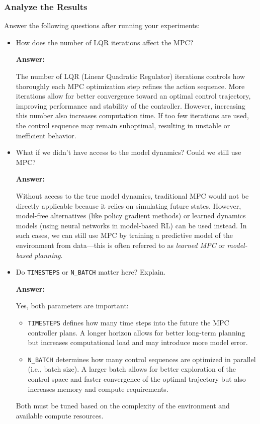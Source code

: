 \subsubsection{Analyze the Results} 
Answer the following questions after running your experiments: 
\begin{itemize} 
    \item How does the number of LQR iterations affect the MPC? 

    \textbf{Answer:}

    The number of LQR (Linear Quadratic Regulator) iterations controls how thoroughly each MPC optimization step refines the action sequence. More iterations allow for better convergence toward an optimal control trajectory, improving performance and stability of the controller. However, increasing this number also increases computation time. If too few iterations are used, the control sequence may remain suboptimal, resulting in unstable or inefficient behavior.

    \item What if we didn't have access to the model dynamics? Could we still use MPC? 

    \textbf{Answer:}

    Without access to the true model dynamics, traditional MPC would not be directly applicable because it relies on simulating future states. However, model-free alternatives (like policy gradient methods) or learned dynamics models (using neural networks in model-based RL) can be used instead. In such cases, we can still use MPC by training a predictive model of the environment from data—this is often referred to as \textit{learned MPC} or \textit{model-based planning}.
    
    \item Do \texttt{TIMESTEPS} or \texttt{N\_BATCH} matter here? Explain. 

    \textbf{Answer:}

    Yes, both parameters are important:
    \begin{itemize}
        \item \texttt{TIMESTEPS} defines how many time steps into the future the MPC controller plans. A longer horizon allows for better long-term planning but increases computational load and may introduce more model error.
        \item \texttt{N\_BATCH} determines how many control sequences are optimized in parallel (i.e., batch size). A larger batch allows for better exploration of the control space and faster convergence of the optimal trajectory but also increases memory and compute requirements.
    \end{itemize}
    Both must be tuned based on the complexity of the environment and available compute resources.


\end{itemize}
